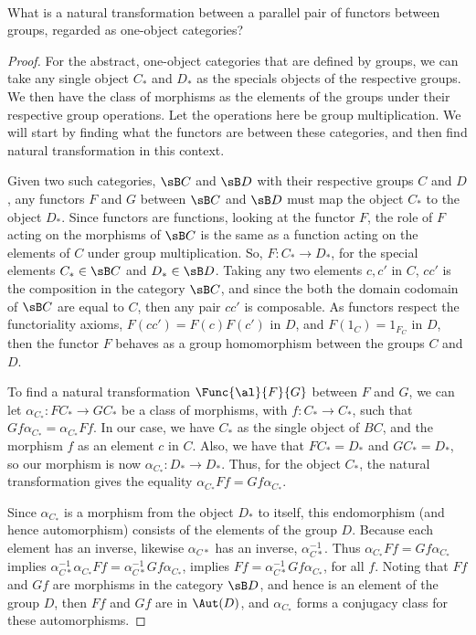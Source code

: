 \documentclass[main.tex]{subfiles}
\begin{document}
\paragraph{}
\begin{exercise}
	What is a natural transformation between a parallel pair of functors between
	groups, regarded as one-object categories?
\end{exercise}

\begin{proof}
	For the abstract, one-object categories that are defined by groups, we can
	take any single object $C_*$ and $D_*$ as the specials objects of the
	respective groups. We then have the class of morphisms as the elements of
	the groups under their respective group operations. Let the operations here
	be group multiplication. We will start by finding what the functors are
	between these categories, and then find natural transformation in this
	context.

	Given two such categories, $\sB C$ and $\sB D$ with their respective groups $C$
	and $D$, any functors $F$ and $G$ between $\sB C$ and $\sB D$ must map the object
	$C_*$ to the object $D_*$. Since functors are functions, looking at the
	functor $F$, the role of $F$ acting on the morphisms of $\sB C$ is the same as
	a function acting on the elements of $C$ under group multiplication. So, $F:
	C_* \rightarrow D_*$, for the special elements $C_* \in \sB C$ and $D_* \in \sB D$.
	Taking any two elements $c, c'$ in $C$, $cc'$ is the composition in the
	category $\sB C$, and since the both the domain codomain of $\sB C$ are equal to $ C $, then any pair
	$cc'$ is composable. As functors respect the functoriality axioms, $F(cc') =
	F(c)F(c')$ in $D$, and $F(1_C) = 1_{F_C}$ in $D$, then the functor $F$
	behaves as a group homomorphism between the groups $C$ and $D$.

	To find a natural transformation $\Func{\al}{F}{G}$ between $F$ and $G$,
	we can let $\alpha_{C_*}\colon FC_* \rightarrow GC_*$ be a class of morphisms,
	with $f\colon C_* \rightarrow C_*$, such that $Gf\alpha_{C_*} = \alpha_{C_*}Ff$.
	In our case, we have $C_*$ as the single object of $BC$, and the morphism
	$f$ as an element $c$ in $C$. Also, we have that $FC_* = D_*$ and $GC_* =
	D_*$, so our morphism is now $\alpha_{C_*}\colon D_* \rightarrow D_*$.
	Thus, for the object $C_*$, the natural transformation gives the equality
	$\alpha_{C_*}Ff = Gf \alpha_{C_*}$.

	Since $\alpha_{C_*}$ is a morphism from the object $D_*$ to itself, this
	endomorphism (and hence automorphism) consists of the elements of the group
	$D$. Because each element has an inverse, likewise $\alpha_{C*}$ has an
	inverse, $\alpha_{C*}^{-1}$. Thus $\alpha_{C_*}Ff = Gf \alpha_{C_*}$ implies
	$\alpha_{C*}^{-1} \alpha_{C_*}Ff = \alpha_{C*}^{-1} Gf \alpha_{C_*}$,
	implies $Ff = \alpha_{C*}^{-1} Gf \alpha_{C_*}$, for all $f$. Noting that
	$Ff$ and $Gf$ are morphisms in the category $\sB D$, and hence is an element of
	the group $D$, then $Ff$ and $Gf$ are in $\Aut(D)$, and $\alpha_{C_*}$ forms
	a conjugacy class for these automorphisms.
\end{proof}
\end{document}

